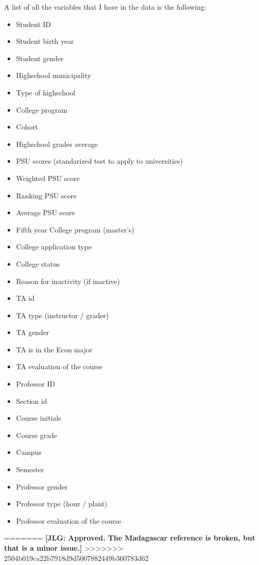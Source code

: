 A list of all the variables that I have in the data is the following:
\begin{itemize}
	\item Student ID
	\item Student birth year
	\item Student gender
	\item Highschool municipality
	\item Type of highschool
	\item College program
	\item Cohort
	\item Highschool grades average
	\item PSU scores (standarized test to apply to universities)
	\item Weighted PSU score
	\item Ranking PSU score
	\item Average PSU score
	\item Fifth year College program (master's)
	\item College application type
	\item College status
	\item Reason for inactivity (if inactive)
	\item TA id
	\item TA type (instructor / grader)
	\item TA gender
	\item TA is in the Econ major
	\item TA evaluation of the course
	\item Professor ID
	\item Section id
	\item Course initials
	\item Course grade
	\item Campus
	\item Semester
	\item Professor gender
	\item Professor type (hour / plant)
	\item Professor evaluation of the course
\end{itemize}

=======
 \noindent \textbf{[JLG: Approved. The Madagascar reference is broken, but that is a minor issue.]}
>>>>>>> 2504b019ca22b7918d9d5007882449b360783d62





